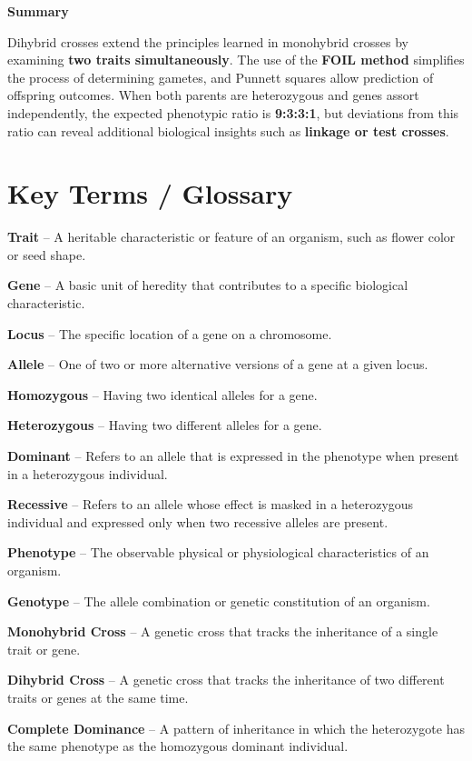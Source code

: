 \documentclass[
  letterpaper,
  DIV=11,
  numbers=noendperiod]{scrreprt}
\begin{document}
\textbf{Summary}

Dihybrid crosses extend the principles learned in monohybrid crosses by
examining \textbf{two traits simultaneously}. The use of the
\textbf{FOIL method} simplifies the process of determining gametes, and
Punnett squares allow prediction of offspring outcomes. When both
parents are heterozygous and genes assort independently, the expected
phenotypic ratio is \textbf{9:3:3:1}, but deviations from this ratio can
reveal additional biological insights such as \textbf{linkage or test
crosses}.

\section{\texorpdfstring{\textbf{Key Terms /
Glossary}}{Key Terms / Glossary}}\label{key-terms-glossary}

\textbf{Trait} -- A heritable characteristic or feature of an organism,
such as flower color or seed shape.

\textbf{Gene} -- A basic unit of heredity that contributes to a specific
biological characteristic.

\textbf{Locus} -- The specific location of a gene on a chromosome.

\textbf{Allele} -- One of two or more alternative versions of a gene at
a given locus.

\textbf{Homozygous} -- Having two identical alleles for a gene.

\textbf{Heterozygous} -- Having two different alleles for a gene.

\textbf{Dominant} -- Refers to an allele that is expressed in the
phenotype when present in a heterozygous individual.

\textbf{Recessive} -- Refers to an allele whose effect is masked in a
heterozygous individual and expressed only when two recessive alleles
are present.

\textbf{Phenotype} -- The observable physical or physiological
characteristics of an organism.

\textbf{Genotype} -- The allele combination or genetic constitution of
an organism.

\textbf{Monohybrid Cross} -- A genetic cross that tracks the inheritance
of a single trait or gene.

\textbf{Dihybrid Cross} -- A genetic cross that tracks the inheritance
of two different traits or genes at the same time.

\textbf{Complete Dominance} -- A pattern of inheritance in which the
heterozygote has the same phenotype as the homozygous dominant
individual.
\end{document}
